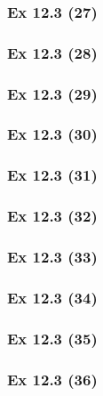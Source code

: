 \subsubsection{Ex 12.3 (27)}\label{sec:Ex_12.3.27}

\subsubsection{Ex 12.3 (28)}\label{sec:Ex_12.3.28}

\subsubsection{Ex 12.3 (29)}\label{sec:Ex_12.3.29}

\subsubsection{Ex 12.3 (30)}\label{sec:Ex_12.3.30}

\newpage		%

\subsubsection{Ex 12.3 (31)}\label{sec:Ex_12.3.31}

\subsubsection{Ex 12.3 (32)}\label{sec:Ex_12.3.32}

\subsubsection{Ex 12.3 (33)}\label{sec:Ex_12.3.33}

\subsubsection{Ex 12.3 (34)}\label{sec:Ex_12.3.34}

\subsubsection{Ex 12.3 (35)}\label{sec:Ex_12.3.35}

\subsubsection{Ex 12.3 (36)}\label{sec:Ex_12.3.36}

